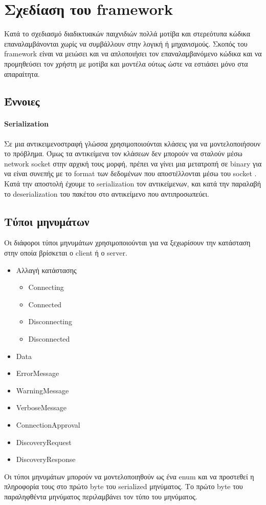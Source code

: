 		\section{Σχεδίαση του framework}
		Κατά το σχεδιασμό διαδικτυακών παιχνιδιών πολλά μοτίβα και στερεότυπα κώδικα επαναλαμβάνονται χωρίς να συμβάλλουν στην λογική ή μηχανισμούς. Σκοπός του framework είναι να μειώσει και να απλοποιήσει τον επαναλαμβανόμενο κώδικα και να προμηθεύσει τον χρήστη με μοτίβα και μοντέλα ούτως ώστε να εστιάσει μόνο στα απαραίτητα.
		
		\subsection{Έννοιες}
		\paragraph{Serialization}
		Σε μια αντικειμενοστραφή γλώσσα χρησιμοποιούνται κλάσεις για να μοντελοποιήσουν το πρόβλημα. Όμως τα αντικείμενα τον κλάσεων δεν μπορούν να σταλούν μέσω network socket στην αρχική τους μορφή, πρέπει να γίνει μια μετατροπή σε binary για να είναι συνεπής με το format των δεδομένων που αποστέλλονται μέσω του socket . Κατά την αποστολή έχουμε το serialization τον αντικείμενων, και κατά την παραλαβή το deserialization του πακέτου στο αντικείμενο που αντιπροσωπεύει.
		\subsection{Τύποι μηνυμάτων}
		Οι διάφοροι τύποι μηνυμάτων χρησιμοποιούνται για να ξεχωρίσουν την κατάσταση στην οποία βρίσκεται ο client ή ο server.
			\begin{itemize}
				\item Αλλαγή κατάστασης
				\begin{itemize}
					\item Connecting
					\item Connected
					\item Disconnecting
					\item Disconnected
				\end{itemize}
				\item Data
				\item ErrorMessage
				\item WarningMessage
				\item VerboseMessage
				\item ConnectionApproval
				\item DiscoveryRequest
				\item DiscoveryResponse
			\end{itemize}
		Οι τύποι μηνυμάτων μπορούν να μοντελοποιηθούν ως ένα enum και να προστεθεί η πληροφορία τους στο πρώτο byte του serialized μηνύματος. Το πρώτο byte του παραληφθέντα μηνύματος περιλαμβάνει τον τύπο του μηνύματος.
		
